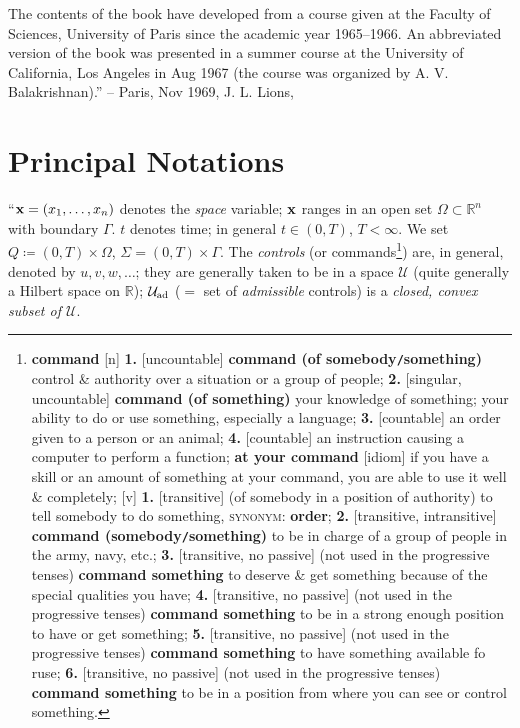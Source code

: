 \documentclass[oneside]{book}
\numberwithin{equation}{section}
\begin{document}
The contents of the book have developed from a course given at the Faculty of Sciences, University of Paris since the academic year 1965--1966. An abbreviated version of the book was presented in a summer course at the University of California, Los Angeles in Aug 1967 (the course was organized by A. V. Balakrishnan).'' -- Paris, Nov 1969, J. L. Lions, \cite[pp. 1--3]{Lions1971}

\section*{Principal Notations}
``${\bf x} = (x_1,\ldots,x_n)$ denotes the \textit{space} variable; ${\bf x}$ ranges in an open set $\Omega\subset\mathbb{R}^n$ with boundary $\Gamma$. $t$ denotes time; in general $t\in(0,T)$, $T < \infty$. We set $Q\coloneqq(0,T)\times\Omega$, $\Sigma = (0,T)\times\Gamma$. The \textit{controls} (or commands\footnote{\textbf{command} [n] \textbf{1.} [uncountable] \textbf{command (of somebody\texttt{/}something)} control \& authority over a situation or a group of people; \textbf{2.} [singular, uncountable] \textbf{command (of something)} your knowledge of something; your ability to do or use something, especially a language; \textbf{3.} [countable] an order given to a person or an animal; \textbf{4.} [countable] an instruction causing a computer to perform a function; \textbf{at your command} [idiom] if you have a skill or an amount of something at your command, you are able to use it well \& completely; [v] \textbf{1.} [transitive] (of somebody in a position of authority) to tell somebody to do something, \textsc{synonym}: \textbf{order}; \textbf{2.} [transitive, intransitive] \textbf{command (somebody\texttt{/}something)} to be in charge of a group of people in the army, navy, etc.; \textbf{3.} [transitive, no passive] (not used in the progressive tenses) \textbf{command something} to deserve \& get something because of the special qualities you have; \textbf{4.} [transitive, no passive] (not used in the progressive tenses) \textbf{command something} to be in a strong enough position to have or get something; \textbf{5.} [transitive, no passive] (not used in the progressive tenses) \textbf{command something} to have something available fo ruse; \textbf{6.} [transitive, no passive] (not used in the progressive tenses) \textbf{command something} to be in a position from where you can see or control something.}) are, in general, denoted by $u,v,w,\ldots$; they are generally taken to be in a space $\mathcal{U}$ (quite generally a Hilbert space on $\mathbb{R}$); $\mathcal{U}_{\rm ad}$ ($=$ set of \textit{admissible} controls) is a \textit{closed, convex subset of $\mathcal{U}$}.
\end{document}
